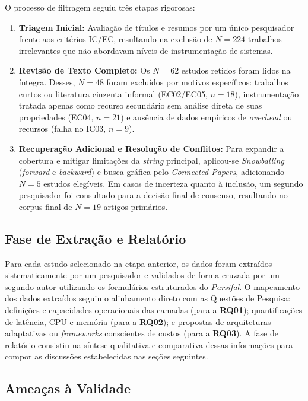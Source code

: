 \documentclass[sigconf, anonymous]{acmart}
\begin{document}
O processo de filtragem seguiu três etapas rigorosas:
\begin{enumerate}
    \item \textbf{Triagem Inicial:} Avaliação de títulos e resumos por um único pesquisador frente aos critérios IC/EC, resultando na exclusão de $N = 224$ trabalhos irrelevantes que não abordavam níveis de instrumentação de sistemas.
    \item \textbf{Revisão de Texto Completo:} Os $N = 62$ estudos retidos foram lidos na íntegra. Desses, $N = 48$ foram excluídos por motivos específicos: trabalhos curtos ou literatura cinzenta informal (EC02/EC05, $n = 18$), instrumentação tratada apenas como recurso secundário sem análise direta de suas propriedades (EC04, $n = 21$) e ausência de dados empíricos de \textit{overhead} ou recursos (falha no IC03, $n = 9$).
    \item \textbf{Recuperação Adicional e Resolução de Conflitos:} Para expandir a cobertura e mitigar limitações da \textit{string} principal, aplicou-se \textit{Snowballing} (\textit{forward} e \textit{backward}) e busca gráfica pelo \textit{Connected Papers}, adicionando $N = 5$ estudos elegíveis. Em casos de incerteza quanto à inclusão, um segundo pesquisador foi consultado para a decisão final de consenso, resultando no corpus final de $N = 19$ artigos primários.
\end{enumerate}

\subsection{Fase de Extração e Relatório}

Para cada estudo selecionado na etapa anterior, os dados foram extraídos sistematicamente por um pesquisador e validados de forma cruzada por um segundo autor utilizando os formulários estruturados do \textit{Parsifal}. O mapeamento dos dados extraídos seguiu o alinhamento direto com as Questões de Pesquisa: definições e capacidades operacionais das camadas (para a \textbf{RQ01}); quantificações de latência, CPU e memória (para a \textbf{RQ02}); e propostas de arquiteturas adaptativas ou \textit{frameworks} conscientes de custos (para a \textbf{RQ03}). A fase de relatório consistiu na síntese qualitativa e comparativa dessas informações para compor as discussões estabelecidas nas seções seguintes.

\subsection{Ameaças à Validade}
\label{sec:ameacas-validade}
\end{document}
